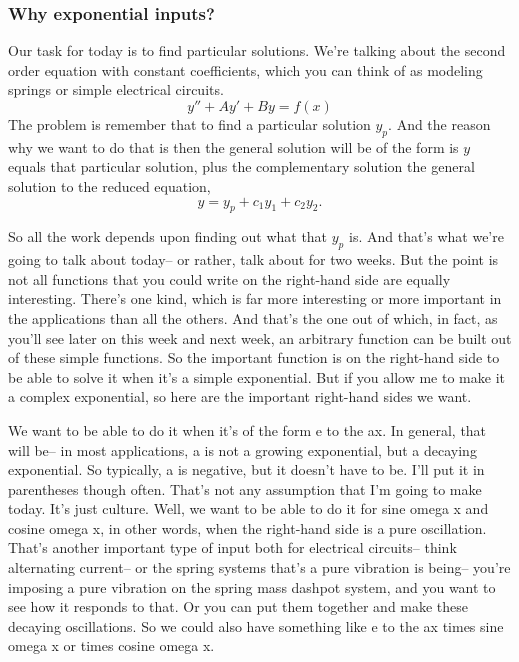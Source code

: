 \subsubsection{Why exponential inputs?}
Our task for today is to find particular solutions.
We're talking about the second order equation with constant coefficients,
which you can think of as modeling springs or simple electrical circuits.
\begin{equation*}
  y'' + Ay' + By = f(x)
\end{equation*}
The problem is remember that to find a particular solution $y_p$. 
And the reason why we want to do that is then the general solution will be
of the form is $y$ equals that particular solution, plus the complementary solution
the general solution to the reduced equation,
\begin{equation*}
  y = y_p + c_1 y_1 + c_2 y_2. 
\end{equation*}

So all the work depends upon finding out what that $y_p$ is.
And that's what we're going to talk about today--
or rather, talk about for two weeks.
But the point is not all functions
that you could write on the right-hand side
are equally interesting.
There's one kind, which is far more interesting or more
important in the applications than all the others.
And that's the one out of which, in fact,
as you'll see later on this week and next week,
an arbitrary function can be built out
of these simple functions.
So the important function is on the right-hand side
to be able to solve it when it's a simple exponential.
But if you allow me to make it a complex exponential,
so here are the important right-hand sides we want.

We want to be able to do it when it's of the form e to the ax.
In general, that will be--
in most applications, a is not a growing exponential,
but a decaying exponential.
So typically, a is negative, but it doesn't have to be.
I'll put it in parentheses though often.
That's not any assumption that I'm going to make today.
It's just culture.
Well, we want to be able to do it for sine omega
x and cosine omega x, in other words, when the right-hand side
is a pure oscillation.
That's another important type of input both for electrical
circuits-- think alternating current--
or the spring systems that's a pure vibration is being--
you're imposing a pure vibration on the spring mass dashpot
system, and you want to see how it responds to that.
Or you can put them together and make these decaying
oscillations.
So we could also have something like e to the ax times
sine omega x or times cosine omega x.

